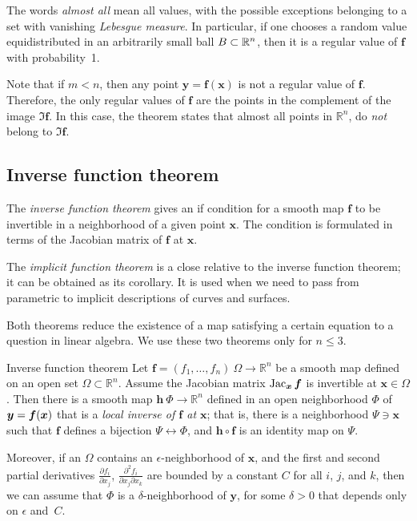 The words \emph{almost all} mean all values, with the possible exceptions belonging to a set with vanishing {}\emph{Lebesgue measure}.
In particular, if one chooses a random value equidistributed in an arbitrarily small ball $B\z\subset \mathbb{R}^n$, then it is a regular value of $\bm{f}$ with probability~1.

Note that if $m<n$, then any point $\bm{y}=\bm{f}(\bm{x})$ is not a regular value of $\bm{f}$.
Therefore, the only regular values of $\bm{f}$ are the points in the complement of the image $\Im \bm{f}$.
In this case, the theorem states that almost all points in $\mathbb{R}^n$, do \textit{not} belong to $\Im \bm{f}$.


\subsection*{Inverse function theorem}

The \emph{inverse function theorem} gives an if condition for a smooth map $\bm{f}$ to be invertible in a neighborhood of a given point $\bm{x}$.
The condition is formulated in terms of the Jacobian matrix of $\bm{f}$ at $\bm{x}$.

The \emph{implicit function theorem} is a close relative to the inverse function theorem;
it can be obtained as its corollary.
It is used when we need to pass from parametric to implicit descriptions of curves and surfaces.

Both theorems reduce the existence of a map satisfying a certain equation to a question in linear algebra.
We use these two theorems only for $n\le 3$.

\begin{thm}{Inverse function theorem}\label{thm:inverse}
Let $\bm{f}=(f_1,\dots,f_n)\:\Omega\to\mathbb{R}^n$ be a smooth map
defined on an open set $\Omega\subset \mathbb{R}^n$.
Assume the Jacobian matrix
$\mathop{\rm Jac}\nolimits_{\bm{x}}\bm{f}$
is invertible at $\bm{x}\in \Omega$.
Then there is a smooth map $\bm{h}\:\Phi\to\mathbb{R}^n$ defined in an open neighborhood $\Phi$ of ${\bm{y}}\z=\bm{f}(\bm{x})$ that is a {}\emph{local inverse of $\bm{f}$ at $\bm{x}$};
that is, there is a neighborhood $\Psi\ni \bm{x}$ such that
$\bm{f}$ defines a bijection $\Psi\leftrightarrow \Phi$, and
$\bm{h} \circ \bm{f}$ is an identity map on $\Psi$.

Moreover, if an $\Omega$ contains an $\epsilon$-neighborhood of $\bm{x}$, and the first and second partial derivatives $\tfrac{\partial f_i}{\partial x_j}$, $\tfrac{\partial^2 f_i}{\partial x_j\partial x_k}$ are bounded by a constant $C$ for all $i$, $j$, and $k$, then we can assume that $\Phi$ is a $\delta$-neighborhood of $\bm{y}$, for some $\delta>0$ that depends only on $\epsilon$ and~$C$. 
\end{thm}

